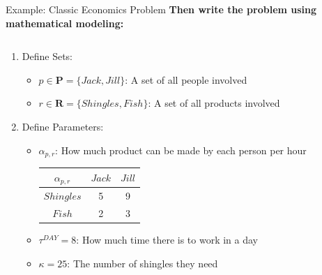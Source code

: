\documentclass[10pt, aspectratio=169]{beamer}
\begin{document}
\begin{frame}[t]{Example: Classic Economics Problem}
    \textbf{Then write the problem using mathematical modeling:}
    \begin{columns}[t]
        \begin{column}[t]{0.5\textwidth}
            \begin{enumerate}
                \item Define Sets:
                \begin{itemize}
                    \item $p \in \textbf{P} = \{Jack, Jill\}$: A set of all people involved
                    \item $r \in \textbf{R} = \{Shingles, Fish\}$: A set of all products involved
                \end{itemize}
                \item Define Parameters:
                \begin{itemize}
                    \item $\alpha_{p,r}$: How much product can be made by each person per hour
                    \begin{center}
                        \begin{tabular}{|c||c|c|}
                            \hline
                            $\alpha_{p,r}$ & $Jack$ & $Jill$ \\ 
                            \hline \hline
                            $Shingles$ & 5 & 9 \\  
                            \hline
                            $Fish$ & 2 & 3\\
                            \hline  
                        \end{tabular}
                    \end{center}
                    \item $\tau^{DAY} = 8$: How much time there is to work in a day
                    \item $\kappa = 25$: The number of shingles they need
                    

\end{itemize}
\end{enumerate}
\end{column}
\end{columns}
\end{frame}
\end{document}
